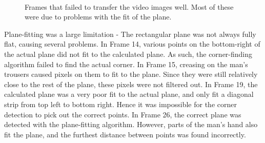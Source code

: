 \documentclass[11pt]{article}
\begin{document}
\begin{figure}[h]
  \centering
   ~
   ~
   ~
   ~
  \caption{Frames that failed to transfer the video images well. Most of these were due to problems with the fit of the plane.}
  \label{fig:failvid}
\end{figure}

Plane-fitting was a large limitation - The rectangular plane was not always fully flat, causing several problems. In Frame 14, various points on the bottom-right of the actual plane did not fit to the calculated plane. As such, the corner-finding algorithm failed to find the actual corner. In Frame 15, creasing on the man's trousers caused pixels on them to fit to the plane. Since they were still relatively close to the rest of the plane, these pixels were not filtered out. In Frame 19, the calculated plane was a very poor fit to the actual plane, and only fit a diagonal strip from top left to bottom right. Hence it was impossible for the corner detection to pick out the correct points. In Frame 26, the correct plane was detected with the plane-fitting algorithm. However, parts of the man's hand also fit the plane, and the furthest distance between points was found incorrectly. 
\end{document}
